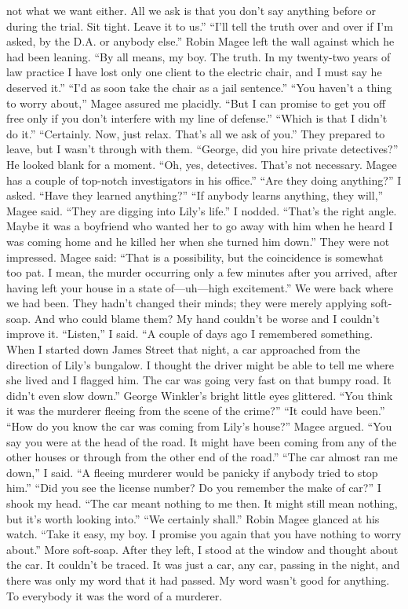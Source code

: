 \documentclass{novel}
\begin{document}
not what we want either. All we ask is that you don’t say anything before or during the trial. Sit tight. Leave it to us.” “I’ll tell the truth over and over if I’m asked, by the D.A. or anybody else.” Robin Magee left the wall against which he had been leaning. “By all means, my boy. The truth. In my twenty-two years of law practice I have lost only one client to the electric chair, and I must say he deserved it.” “I’d as soon take the chair as a jail sentence.” “You haven’t a thing to worry about,” Magee assured me placidly. “But I can promise to get you off free only if you don’t interfere with my line of defense.” “Which is that I didn’t do it.” “Certainly. Now, just relax. That’s all we ask of you.” They prepared to leave, but I wasn’t through with them. “George, did you hire private detectives?” He looked blank for a moment. “Oh, yes, detectives. That’s not necessary. Magee has a couple of top-notch investigators in his office.” “Are they doing anything?” I asked. “Have they learned anything?” “If anybody learns anything, they will,” Magee said. “They are digging into Lily’s life.” I nodded. “That’s the right angle. Maybe it was a boyfriend who wanted her to go away with him when he heard I was coming home and he killed her when she turned him down.” They were not impressed. Magee said: “That is a possibility, but the coincidence is somewhat too pat. I mean, the murder occurring only a few minutes after you arrived, after having left your house in a state of—uh—high excitement.” We were back where we had been. They hadn’t changed their minds; they were merely applying soft-soap. And who could blame them? My hand couldn’t be worse and I couldn’t improve it. “Listen,” I said. “A couple of days ago I remembered something. When I started down James Street that night, a car approached from the direction of Lily’s bungalow. I thought the driver might be able to tell me where she lived and I flagged him. The car was going very fast on that bumpy road. It didn’t even slow down.” George Winkler’s bright little eyes glittered. “You think it was the murderer fleeing from the scene of the crime?” “It could have been.” “How do you know the car was coming from Lily’s house?” Magee argued. “You say you were at the head of the road. It might have been coming from any of the other houses or through from the other end of the road.” “The car almost ran me down,” I said. “A fleeing murderer would be panicky if anybody tried to stop him.” “Did you see the license number? Do you remember the make of car?” I shook my head. “The car meant nothing to me then. It might still mean nothing, but it’s worth looking into.” “We certainly shall.” Robin Magee glanced at his watch. “Take it easy, my boy. I promise you again that you have nothing to worry about.” More soft-soap. After they left, I stood at the window and thought about the car. It couldn’t be traced. It was just a car, any car, passing in the night, and there was only my word that it had passed. My word wasn’t good for anything. To everybody it was the word of a murderer.
\end{document}
